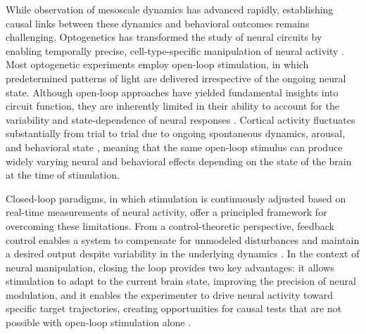 \documentclass[11pt]{article}
\begin{document}
While observation of mesoscale dynamics has advanced rapidly, establishing causal links between these dynamics and behavioral outcomes remains challenging. Optogenetics has transformed the study of neural circuits by enabling temporally precise, cell-type-specific manipulation of neural activity \citep{deisseroth2011optogenetics, fenno2011development}. Most optogenetic experiments employ open-loop stimulation, in which predetermined patterns of light are delivered irrespective of the ongoing neural state. Although open-loop approaches have yielded fundamental insights into circuit function, they are inherently limited in their ability to account for the variability and state-dependence of neural responses \citep{grosenick2015closed}. Cortical activity fluctuates substantially from trial to trial due to ongoing spontaneous dynamics, arousal, and behavioral state \citep{harris2011cortical}, meaning that the same open-loop stimulus can produce widely varying neural and behavioral effects depending on the state of the brain at the time of stimulation.

Closed-loop paradigms, in which stimulation is continuously adjusted based on real-time measurements of neural activity, offer a principled framework for overcoming these limitations. From a control-theoretic perspective, feedback control enables a system to compensate for unmodeled disturbances and maintain a desired output despite variability in the underlying dynamics \citep{astrom1995pid}. In the context of neural manipulation, closing the loop provides two key advantages: it allows stimulation to adapt to the current brain state, improving the precision of neural modulation, and it enables the experimenter to drive neural activity toward specific target trajectories, creating opportunities for causal tests that are not possible with open-loop stimulation alone \citep{oshea2018importance}.
\end{document}
